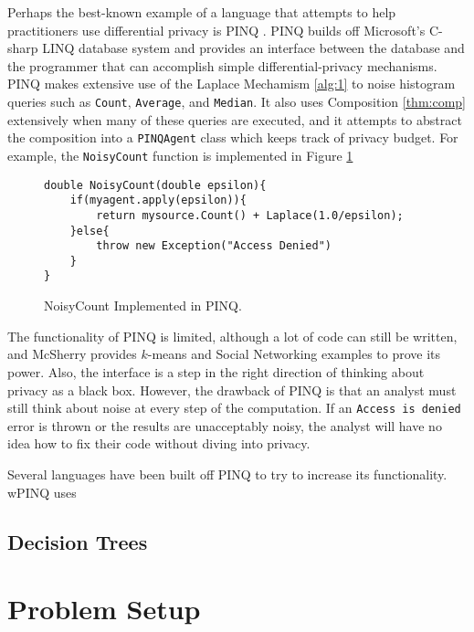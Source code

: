 \documentclass[11pt]{article}
\begin{document}
Perhaps the best-known example of a language that attempts to help practitioners use differential privacy is PINQ \cite{McSherry:2010}. PINQ builds off Microsoft's C-sharp LINQ database system and provides an interface between the database and the programmer that can accomplish simple differential-privacy mechanisms. PINQ makes extensive use of the Laplace Mechamism \ref{alg:1} to noise histogram queries such as \texttt{Count}, \texttt{Average}, and \texttt{Median}. It also uses Composition \ref{thm:comp} extensively when many of these queries are executed, and it attempts to abstract the composition into a \texttt{PINQAgent} class which keeps track of privacy budget. For example, the \texttt{NoisyCount} function is implemented in Figure \ref{fig:PINQNoisyCount}
\begin{figure}
\begin{verbatim}
double NoisyCount(double epsilon){
    if(myagent.apply(epsilon)){
        return mysource.Count() + Laplace(1.0/epsilon);
    }else{
        throw new Exception("Access Denied")
    }
}
\end{verbatim}
\caption{NoisyCount Implemented in PINQ.}
\label{fig:PINQNoisyCount}
\end{figure}
The functionality of PINQ is limited, although a lot of code can still be written, and McSherry provides $k$-means and Social Networking examples to prove its power. Also, the interface is a step in the right direction of thinking about privacy as a black box. However, the drawback of PINQ is that an analyst must still think about noise at every step of the computation. If an \texttt{Access is denied} error is thrown or the results are unacceptably noisy, the analyst will have no idea how to fix their code without diving into privacy.

Several languages have been built off PINQ to try to increase its functionality. wPINQ \cite{Proserpio:2014} uses 
\subsection{Decision Trees}


\section{Problem Setup}
\end{document}

